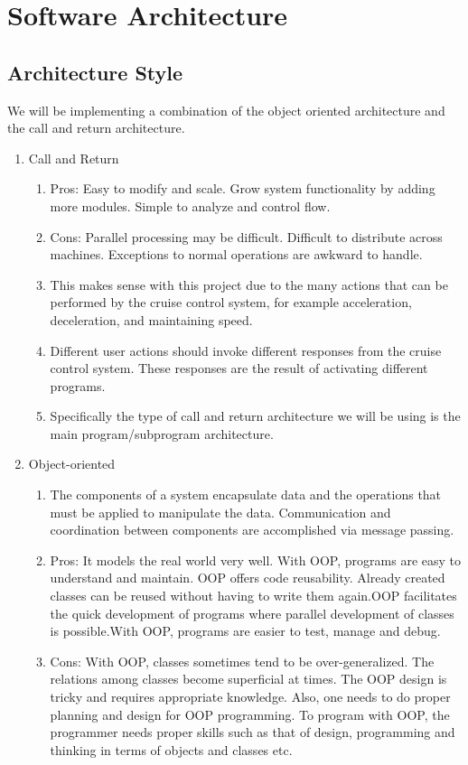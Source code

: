 \documentclass[preprint,11pt,3p]{article}
\begin{document}
\section{Software Architecture}

\subsection{Architecture Style} 
We will be implementing a combination of the object oriented architecture and the call and return architecture.
\begin{enumerate} 
	\item Call and Return 
	\begin{enumerate} 
		\item Pros: Easy to modify and scale. Grow system functionality by adding more modules. Simple to analyze and control flow.
		\item Cons: Parallel processing may be difficult. Difficult to distribute across machines. Exceptions to normal operations are awkward to handle.
		\item This makes sense with this project due to the many actions that can be performed by the cruise control system, for example acceleration, deceleration, and maintaining speed.
		\item Different user actions should invoke different responses from the cruise control system. These responses are the result of activating different programs.
		\item Specifically the type of call and return architecture we will be using is the main program/subprogram architecture.
	\end{enumerate}
	\item Object-oriented
	\begin{enumerate} 
		\item The components of a system encapsulate data and the operations that must be applied to manipulate the data. Communication and coordination between components are accomplished via message passing. 
		\item Pros: It models the real world very well. With OOP, programs are easy to understand and maintain. OOP offers code reusability. Already created classes can be reused without having to write them again.OOP facilitates the quick development of programs where parallel development of classes is possible.With OOP, programs are easier to test, manage and debug.
		\item Cons: With OOP, classes sometimes tend to be over-generalized. The relations among classes become superficial at times. The OOP design is tricky and requires appropriate knowledge. Also, one needs to do proper planning and design for OOP programming. To program with OOP, the programmer needs proper skills such as that of design, programming and thinking in terms of objects and classes etc.
	\end{enumerate} 
\end{enumerate}
\end{document}
